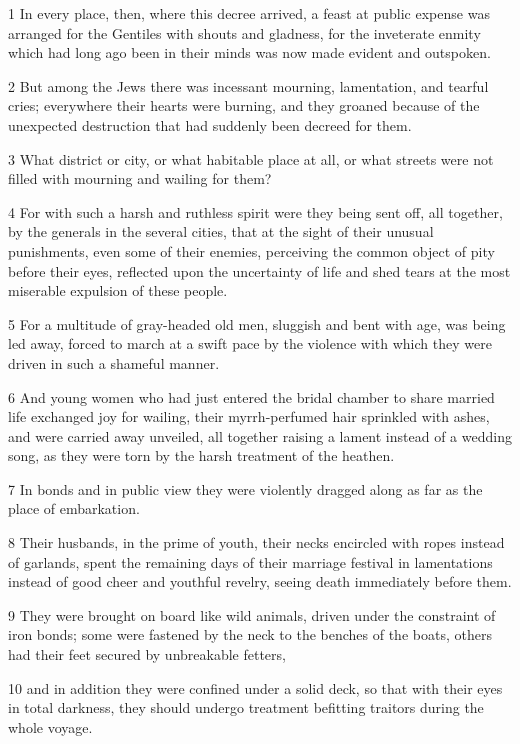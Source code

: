 \par 1 In every place, then, where this decree arrived, a feast at public expense was arranged for the Gentiles with shouts and gladness, for the inveterate enmity which had long ago been in their minds was now made evident and outspoken.
\par 2 But among the Jews there was incessant mourning, lamentation, and tearful cries; everywhere their hearts were burning, and they groaned because of the unexpected destruction that had suddenly been decreed for them.
\par 3 What district or city, or what habitable place at all, or what streets were not filled with mourning and wailing for them?
\par 4 For with such a harsh and ruthless spirit were they being sent off, all together, by the generals in the several cities, that at the sight of their unusual punishments, even some of their enemies, perceiving the common object of pity before their eyes, reflected upon the uncertainty of life and shed tears at the most miserable expulsion of these people.
\par 5 For a multitude of gray-headed old men, sluggish and bent with age, was being led away, forced to march at a swift pace by the violence with which they were driven in such a shameful manner.
\par 6 And young women who had just entered the bridal chamber to share married life exchanged joy for wailing, their myrrh-perfumed hair sprinkled with ashes, and were carried away unveiled, all together raising a lament instead of a wedding song, as they were torn by the harsh treatment of the heathen.
\par 7 In bonds and in public view they were violently dragged along as far as the place of embarkation.
\par 8 Their husbands, in the prime of youth, their necks encircled with ropes instead of garlands, spent the remaining days of their marriage festival in lamentations instead of good cheer and youthful revelry, seeing death immediately before them.
\par 9 They were brought on board like wild animals, driven under the constraint of iron bonds; some were fastened by the neck to the benches of the boats, others had their feet secured by unbreakable fetters,
\par 10 and in addition they were confined under a solid deck, so that with their eyes in total darkness, they should undergo treatment befitting traitors during the whole voyage.

